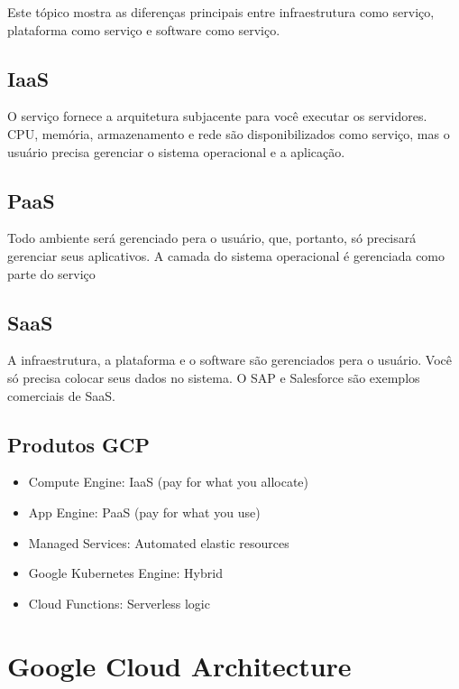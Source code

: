 \documentclass[
]{book}
\providecommand{\tightlist}{%
  \setlength{\itemsep}{0pt}\setlength{\parskip}{0pt}}
\begin{document}
Este tópico mostra as diferenças principais entre infraestrutura como serviço,
plataforma como serviço e software como serviço.

\hypertarget{iaas}{%
\subsection{IaaS}\label{iaas}}

O serviço fornece a arquitetura subjacente para você executar os servidores.
CPU, memória, armazenamento e rede são disponibilizados como serviço, mas
o usuário precisa gerenciar o sistema operacional e a aplicação.

\hypertarget{paas}{%
\subsection{PaaS}\label{paas}}

Todo ambiente será gerenciado pera o usuário, que, portanto, só precisará
gerenciar seus aplicativos. A camada do sistema operacional é gerenciada como
parte do serviço

\hypertarget{saas}{%
\subsection{SaaS}\label{saas}}

A infraestrutura, a plataforma e o software são gerenciados pera o usuário.
Você só precisa colocar seus dados no sistema. O SAP e Salesforce são exemplos
comerciais de SaaS.

\hypertarget{produtos-gcp}{%
\subsection{Produtos GCP}\label{produtos-gcp}}

\begin{itemize}
\tightlist
\item
  Compute Engine: IaaS (pay for what you allocate)
\item
  App Engine: PaaS (pay for what you use)
\item
  Managed Services: Automated elastic resources
\item
  Google Kubernetes Engine: Hybrid
\item
  Cloud Functions: Serverless logic
\end{itemize}

\hypertarget{google-cloud-architecture}{%
\section{Google Cloud Architecture}\label{google-cloud-architecture}}
\end{document}
